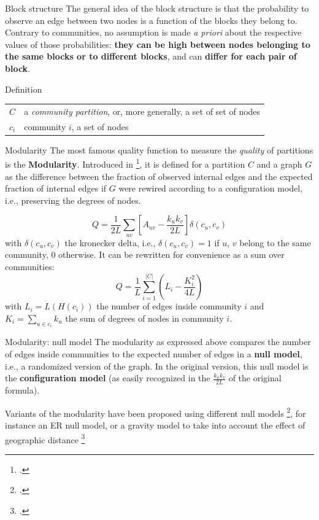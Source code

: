 \documentclass[a4paper,11pt]{book}
\begin{document}
\begin{textbox}{Block structure}
The general idea of the block structure is that the probability to observe an edge between two nodes is a function of the blocks they belong to. Contrary to communities, no assumption is made \textit{a priori} about the respective values of those probabilities: \textbf{they can be high between nodes belonging to the same blocks or to different blocks}, and can \textbf{differ for each pair of block}.

\end{textbox}





\begin{textbox}{Definition}
\begin{tabular}{p{}|p{}}\scriptsize

$C$ & a \textit{community partition}, or, more generally, a set of set of nodes \\
$c_i$ & community $i$, a set of nodes \\
\end{tabular}
\end{textbox}


\begin{textbox}{Modularity}
The most famous quality function to measure the \textit{quality} of partitions is the \textbf{Modularity}. Introduced in \footcite{girvan2002community}, it is defined for a partition $C$ and a graph $G$ as the difference between the fraction of observed internal edges and the expected fraction of internal edges if $G$ were rewired according to a configuration model, i.e., preserving the degrees of nodes.

\[
Q=\frac{1}{2L}\sum_{uv}\left[ A_{uv}-\frac{k_uk_v}{2L}\right] \delta(c_u,c_v)
\]
with $\delta(c_u,c_v)$ the kronecker delta, i.e., $\delta(c_u,c_v)=1$ if $u$, $v$ belong to the same community, 0 otherwise.
It can be rewritten for convenience as a sum over communities:
\[
Q=\frac{1}{L}\sum_{i=1}^{|C|}(L_{i}-\frac{K_i^2}{4L})
\]
with $L_{i}=L(H(c_i))$ the number of edges inside community $i$ and $K_i=\sum_{u \in c_i}k_u$ the sum of degrees of nodes in community $i$.



\end{textbox}

\begin{textbox}{Modularity: null model}
The modularity as expressed above compares the number of edges inside communities to the expected number of edges in a \textbf{null model}, i.e., a randomized version of the graph. In the original version, this null model is the \textbf{configuration model} (as easily recognized in the $\frac{k_uk_v}{2L}$ of the original formula).

Variants of the modularity have been proposed using different null models \footcite{jutla2011generalized}, for instance an ER null model, or a gravity model to take into account the effect of geographic distance \footcite{expert2011uncovering}
\end{textbox}
\end{document}
